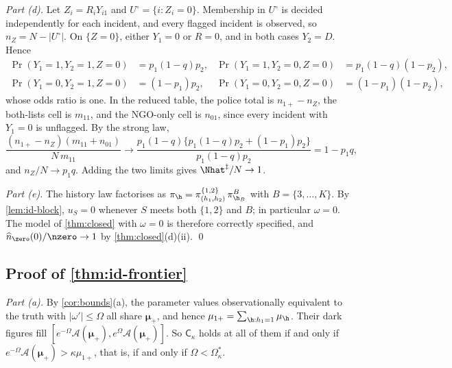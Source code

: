 \emph{Part (d).} Let $Z_i=R_iY_{i1}$ and $U^\circ=\{i:Z_i=0\}$. Membership in $U^\circ$ is decided independently for each incident, and every flagged incident is observed, so $n_Z=N-|U^\circ|$. On $\{Z=0\}$, either $Y_1=0$ or $R=0$, and in both cases $Y_2=D$. Hence
\begin{align*}
  \Pr(Y_1=1,Y_2=1,Z=0)&=p_1(1-q)p_2, & \Pr(Y_1=1,Y_2=0,Z=0)&=p_1(1-q)(1-p_2),\\
  \Pr(Y_1=0,Y_2=1,Z=0)&=(1-p_1)p_2, & \Pr(Y_1=0,Y_2=0,Z=0)&=(1-p_1)(1-p_2),
\end{align*}
whose odds ratio is one. In the reduced table, the police total is $n_{1+}-n_Z$, the both-lists cell is $m_{11}$, and the NGO-only cell is $n_{01}$, since every incident with $Y_1=0$ is unflagged. By the strong law,
\[
  \frac{(n_{1+}-n_Z)(m_{11}+n_{01})}{N\,m_{11}}\to\frac{p_1(1-q)\{p_1(1-q)p_2+(1-p_1)p_2\}}{p_1(1-q)p_2}=1-p_1q,
\]
and $n_Z/N\to p_1q$. Adding the two limits gives $\Nhat^{\ddagger}/N\to1$.

\emph{Part (e).} The history law factorises as $\pi_{\h}=\pi^{\{1,2\}}_{(h_1,h_2)}\,\pi^{B}_{\h_B}$ with $B=\{3,\dots,K\}$. By \cref{lem:id-block}, $u_S=0$ whenever $S$ meets both $\{1,2\}$ and $B$; in particular $\omega=0$. The model of \cref{thm:closed} with $\omega=0$ is therefore correctly specified, and $\widehat n_{\zero}(0)/\nzero\to1$ by \cref{thm:closed}(d)(ii). \qed

\subsection{Proof of \texorpdfstring{\cref{thm:id-frontier}}{the frontier theorem}}\label{app:id-frontier}

\emph{Part (a).} By \cref{cor:bounds}(a), the parameter values observationally equivalent to the truth with $|\omega'|\le\Omega$ all share $\bm\mu_+$, and hence $\mu_{1+}=\sum_{\h:h_1=1}\mu_{\h}$. Their dark figures fill $[e^{-\Omega}\mathcal A(\bm\mu_+),e^{\Omega}\mathcal A(\bm\mu_+)]$. So $\mathsf C_\kappa$ holds at all of them if and only if $e^{-\Omega}\mathcal A(\bm\mu_+)>\kappa\mu_{1+}$, that is, if and only if $\Omega<\Omega^*_\kappa$.

